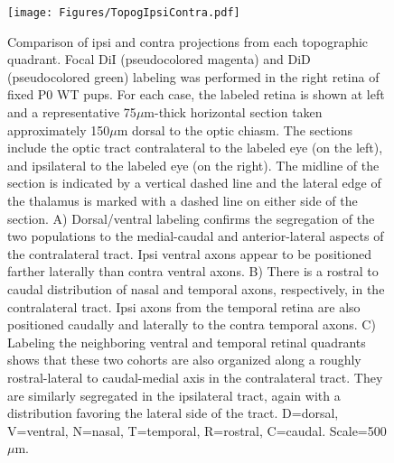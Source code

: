 \begin{figure}[hbtp]
    \begin{center}
        \texttt{[image: Figures/TopogIpsiContra.pdf]}
        \caption[Comparison of ipsi and contra projections from each topographic quadrant.]
        {Comparison of ipsi and contra projections from each topographic quadrant.
        Focal DiI (pseudocolored magenta) and DiD (pseudocolored green) labeling was performed in the right retina of fixed P0 WT pups.
        For each case, the labeled retina is shown at left and a representative 75$\mu$m-thick horizontal section taken approximately 150$\mu$m dorsal to the optic chiasm.
        The sections include the optic tract contralateral to the labeled eye (on the left), and ipsilateral to the labeled eye (on the right).
        The midline of the section is indicated by a vertical dashed line and the lateral edge of the thalamus is marked with a dashed line on either side of the section.
        A) Dorsal/ventral labeling confirms the segregation of the two populations to the medial-caudal and anterior-lateral aspects of the contralateral tract.
        Ipsi ventral axons appear to be positioned farther laterally than contra ventral axons.
        B) There is a rostral to caudal distribution of nasal and temporal axons, respectively, in the contralateral tract.
        Ipsi axons from the temporal retina are also positioned caudally and laterally to the contra temporal axons.
        C) Labeling the neighboring ventral and temporal retinal quadrants shows that these two cohorts are also organized along a roughly rostral-lateral to caudal-medial axis in the contralateral tract.
        They are similarly segregated in the ipsilateral tract, again with a distribution favoring the lateral side of the tract.
        D=dorsal, V=ventral, N=nasal, T=temporal, R=rostral, C=caudal.
        Scale=500$\mu$m.}
        \label{Figures/TopogIpsiContra}
    \end{center}
\end{figure}

